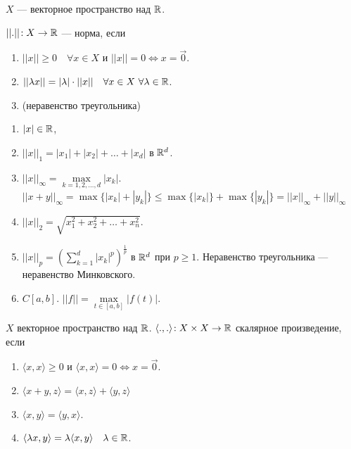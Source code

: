 \begin{definition}
     $X$ --- векторное пространство над  $\mathbb{R}$.

      $||.||\!: X \to \mathbb{R}$ --- норма, если
       \begin{enumerate}
           \item $||x|| \ge 0\quad \forall x \in X$ и $||x|| = 0 \iff x = \overrightarrow{0}$.
           \item  $||\lambda x|| = |\lambda| \cdot ||x||\quad \forall x \in X\ \forall \lambda \in \mathbb{R}$. 
           \item (неравенство треугольника)
      \end{enumerate}
\end{definition}
\begin{example}
     \begin{enumerate}
         \item $|x| \in \mathbb{R}$,
         \item  $||x||_1 = |x_1| + |x_2| + \ldots + |x_d|$ в $\mathbb{R}^d$.
         \item  $||x||_{\infty} = \max\limits_{k=1,2,\ldots, d} |x_k|$. $||x+y||_{\infty} = \max\{|x_k|+|y_k|\} \le \max\{|x_k|\} + \max\{|y_k|\} = ||x||_{\infty} + ||y||_{\infty}$
         \item $||x||_2 = \sqrt{x_1^2 + x_2^2 + \ldots + x_n^2}$.
         \item $||x||_p = \left(\sum\limits_{k=1}^d |x_k|^p\right)^{\frac{1}{p}}$ в $\mathbb{R}^d$ при  $p \ge 1$. Неравенство треугольника --- неравенство Минковского.
         \item $C[a, b]$.  $||f|| = \max\limits_{t \in [a, b]} |f(t)|$. 
     \end{enumerate}
\end{example}
\begin{definition}
    $X$ векторное пространство над  $\mathbb{R}$.  $\langle .,.\rangle\!: X \times X \to \mathbb{R}$ скалярное произведение, если
     \begin{enumerate}
         \item $\langle x, x \rangle \ge 0$ и $\langle x, x \rangle = 0 \iff x = \overrightarrow{0}$.
         \item  $\langle x+y, z\rangle = \langle x, z \rangle + \langle y, z \rangle$
         \item  $\langle x, y \rangle = \langle y, x \rangle$.
         \item  $\langle \lambda x, y \rangle = \lambda \langle x, y \rangle \quad \lambda \in \mathbb{R}$.
    \end{enumerate}
\end{definition}
